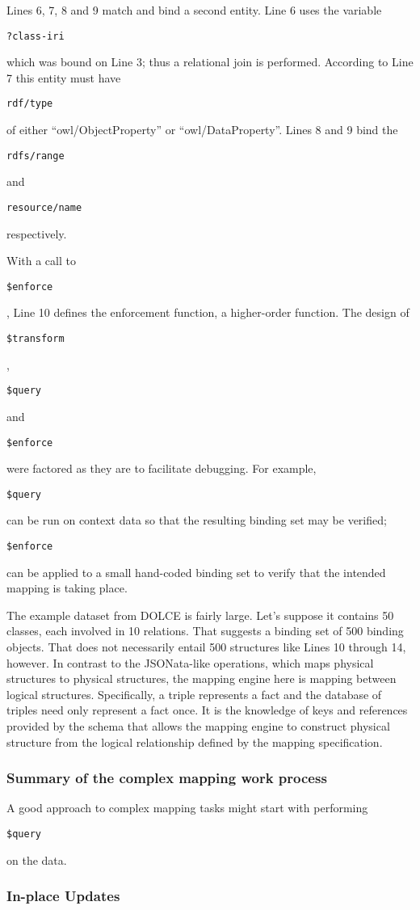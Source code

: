 \documentclass[9pt,letterpaper]{article}
\newcommand{\stt}[1]{\begin{footnotesize}\texttt{#1}\end{footnotesize}}
\begin{document}
Lines 6, 7, 8 and 9 match and bind a second entity.
Line 6 uses the variable \stt{?class-iri} which was bound on Line 3; thus a relational join is performed.
According to Line 7 this entity must have \stt{rdf/type} of either ``owl/ObjectProperty'' or ``owl/DataProperty''.
Lines 8 and 9 bind the \stt{rdfs/range} and \stt{resource/name} respectively.

With a call to \stt{\$enforce}, Line 10 defines the enforcement function, a higher-order function.
The design of \stt{\$transform}, \stt{\$query} and \stt{\$enforce} were factored as they are to facilitate debugging.
For example, \stt{\$query} can be run on context data so that the resulting binding set may be verified;
\stt{\$enforce} can be applied to a small hand-coded binding set to verify that the intended mapping is taking place.

The example dataset from DOLCE is fairly large.
Let's suppose it contains 50 classes, each involved in 10 relations.
That suggests a binding set of 500 binding objects.
That does not necessarily entail 500 structures like Lines 10 through 14, however.
In contrast to the JSONata-like operations, which maps physical structures to physical structures,
the mapping engine here is mapping between logical structures.
Specifically, a triple represents a fact and the database of triples need only represent a fact once.
It is the knowledge of keys and references provided by the schema that allows the mapping engine to construct physical structure
from the logical relationship defined by the mapping specification.

\subsubsection{Summary of the complex mapping work process}
A good approach to complex mapping tasks might start with performing \stt{\$query} on the data.


\subsubsection{In-place Updates}
\end{document}
